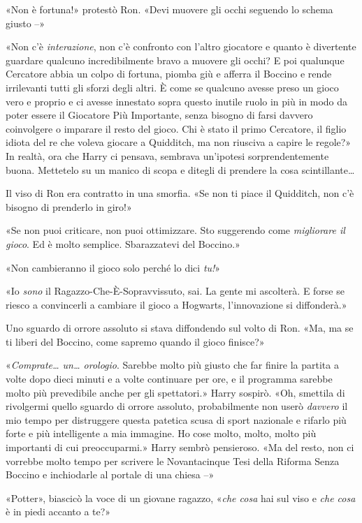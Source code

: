 «Non è fortuna!» protestò Ron. «Devi muovere gli occhi seguendo lo schema giusto –»

«Non c’è \textit{interazione}, non c’è confronto con l’altro giocatore e quanto è divertente guardare qualcuno incredibilmente bravo a muovere gli occhi? E poi qualunque Cercatore abbia un colpo di fortuna, piomba giù e afferra il Boccino e rende irrilevanti tutti gli sforzi degli altri. È come se qualcuno avesse preso un gioco vero e proprio e ci avesse innestato sopra questo inutile ruolo in più in modo da poter essere il Giocatore Più Importante, senza bisogno di farsi davvero coinvolgere o imparare il resto del gioco. Chi è stato il primo Cercatore, il figlio idiota del re che voleva giocare a Quidditch, ma non riusciva a capire le regole?» In realtà, ora che Harry ci pensava, sembrava un’ipotesi sorprendentemente buona. Mettetelo su un manico di scopa e ditegli di prendere la cosa scintillante…

Il viso di Ron era contratto in una smorfia. «Se non ti piace il Quidditch, non c’è bisogno di prenderlo in giro!»

«Se non puoi criticare, non puoi ottimizzare. Sto suggerendo come \textit{migliorare il gioco}. Ed è molto semplice. Sbarazzatevi del Boccino.»

«Non cambieranno il gioco solo perché lo dici \textit{tu!}»

«Io \textit{sono} il Ragazzo-Che-È-Sopravvissuto, sai. La gente mi ascolterà. E forse se riesco a convincerli a cambiare il gioco a Hogwarts, l’innovazione si diffonderà.»

Uno sguardo di orrore assoluto si stava diffondendo sul volto di Ron. «Ma, ma se ti liberi del Boccino, come sapremo quando il gioco finisce?»

«\textit{Comprate… un… orologio}. Sarebbe molto più giusto che far finire la partita a volte dopo dieci minuti e a volte continuare per ore, e il programma sarebbe molto più prevedibile anche per gli spettatori.» Harry sospirò. «Oh, smettila di rivolgermi quello sguardo di orrore assoluto, probabilmente non userò \textit{davvero} il mio tempo per distruggere questa patetica scusa di sport nazionale e rifarlo più forte e più intelligente a mia immagine. Ho cose molto, molto, molto più importanti di cui preoccuparmi.» Harry sembrò pensieroso. «Ma del resto, non ci vorrebbe molto tempo per scrivere le Novantacinque Tesi della Riforma Senza Boccino e inchiodarle al portale di una chiesa –»

«Potter», biascicò la voce di un giovane ragazzo, «\textit{che cosa} hai sul viso e \textit{che cosa} è in piedi accanto a te?»

